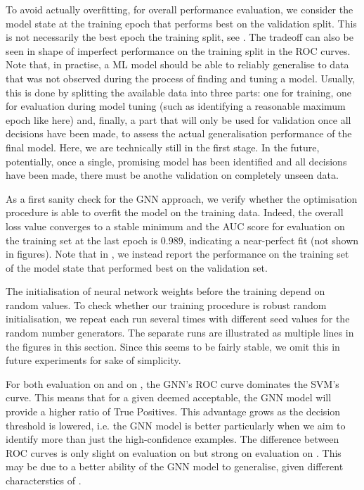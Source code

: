 \documentclass[
	fontsize=10pt, %
	twoside=false, %
	secnumdepth=1, %
  toc=indentunnumbered %
]{kaobook}
\begin{document}
To avoid actually overfitting, for overall performance evaluation, we consider
the model state at the training epoch that performs best on the validation
split. This is not necessarily the best epoch \wrt the training split, see
. The tradeoff can also be seen in shape of imperfect
performance on the training split in the ROC curves.
% 
%
Note that, in practise, a ML model should be able to reliably generalise to data
that was not observed during the process of finding and tuning a model. Usually,
this is done by splitting the available data into three parts: one for training,
one for evaluation during model tuning (such as identifying a reasonable maximum
epoch like here) and, finally, a part that will only be used for validation once
all decisions have been made, to assess the actual generalisation performance of
the final model.
%
Here, we are technically still in the first stage. In the future, potentially,
once a single, promising model has been identified and all decisions have been
made, there must be anothe validation on completely unseen data.

As a first sanity check for the GNN approach, we verify whether the optimisation
procedure is able to overfit the model on the training data. Indeed, the overall
loss value converges to a stable minimum and the AUC score for evaluation on the
training set at the last epoch is $0.989$, indicating a near-perfect fit (not
shown in figures). Note that in , we instead report
the performance on the training set of the model state that performed best on
the validation set.

The initialisation of neural network weights before the training depend on
random values. To check whether our training procedure is robust \wrt random
initialisation, we repeat each run several times with different seed values for
the random number generators. The separate runs are illustrated as multiple
lines in the figures in this section. Since this seems to be fairly stable, we omit this
in future experiments for sake of simplicity.

For both evaluation on \PDMap and on \ReconMap, the GNN's ROC curve dominates
the SVM's curve. This means that for a given \FPR deemed acceptable, the GNN
model will provide a higher ratio of True Positives. This advantage grows as the
decision threshold is lowered, i.e. the GNN model is better particularly when we
aim to identify more than just the high-confidence examples. The difference
between ROC curves is only slight on evaluation on \PDMap but strong on
evaluation on \ReconMap. This may be due to a better ability of the GNN model to
generalise, given different characterstics of \ReconMap.
\end{document}
